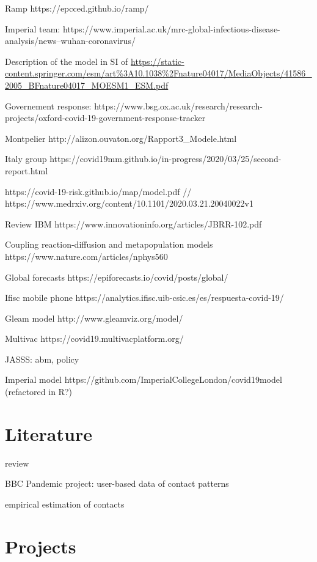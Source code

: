 \documentclass[10pt]{article}
\begin{document}
	
Ramp https://epcced.github.io/ramp/


Imperial team: https://www.imperial.ac.uk/mrc-global-infectious-disease-analysis/news--wuhan-coronavirus/

Description of the model in SI of \cite{ferguson2005strategies}
\url{https://static-content.springer.com/esm/art\%3A10.1038\%2Fnature04017/MediaObjects/41586_2005_BFnature04017_MOESM1_ESM.pdf}


Governement response: https://www.bsg.ox.ac.uk/research/research-projects/oxford-covid-19-government-response-tracker


Montpelier http://alizon.ouvaton.org/Rapport3_Modele.html

Italy group https://covid19mm.github.io/in-progress/2020/03/25/second-report.html


https://covid-19-risk.github.io/map/model.pdf // 
https://www.medrxiv.org/content/10.1101/2020.03.21.20040022v1

Review IBM https://www.innovationinfo.org/articles/JBRR-102.pdf

Coupling reaction-diffusion and metapopulation models https://www.nature.com/articles/nphys560


Global forecasts https://epiforecasts.io/covid/posts/global/

Ifisc mobile phone https://analytics.ifisc.uib-csic.es/es/respuesta-covid-19/

Gleam model http://www.gleamviz.org/model/

Multivac https://covid19.multivacplatform.org/

\cite{adam2020special}

\cite{squazzoni2020} JASSS: abm, policy


Imperial model https://github.com/ImperialCollegeLondon/covid19model (refactored in R?)

\section{Literature}

\cite{Heesterbeekaaa4339} review

\cite{Klepac2020.02.16.20023754} \cite{gog2020you} BBC Pandemic project: user-based data of contact patterns

\cite{mossong2008social} empirical estimation of contacts


\section{Projects}
\end{document}
